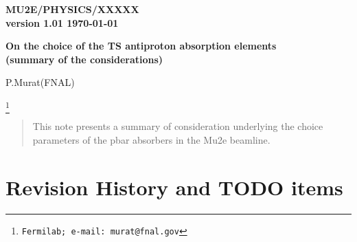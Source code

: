 \documentclass[12pt]{article}
\begin{document}
\begin{titlepage}
  \begin{flushright}
    \bf {MU2E/PHYSICS/XXXXX} \\
    version 1.01
    \today
 \end{flushright}

  \vspace{1cm}

  \begin{center}
    {\Large \bf On the choice of the TS antiproton absorption elements \\

      \vspace{0.3in}
      (summary of the considerations)
    }

    \vspace{1cm}
    P.Murat(FNAL)

    \footnote{\texttt{Fermilab; e-mail: murat@fnal.gov}}
    \vspace{0.3cm}

    \vspace{0.8cm}
  \end{center}

  \begin{abstract}
    \vspace{0.2in}
    This note presents a summary of consideration underlying the choice
    parameters of the pbar absorbers in the Mu2e beamline.
  \end{abstract}

\end{titlepage}
%
%
%
{\tableofcontents}

% 


\newpage
\section {Revision History and TODO items}
\end{document}
